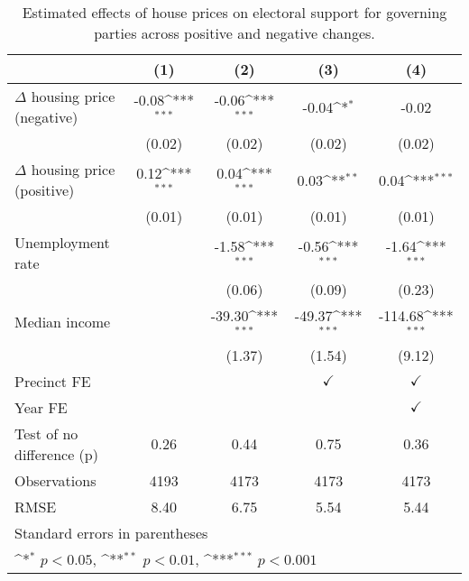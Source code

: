 \begin{table}[htbp]\centering
\def\sym#1{\ifmmode^{#1}\else\(^{#1}\)\fi}
\caption{Estimated effects of house prices on electoral support for governing parties across positive and negative changes.} \label{tab4}
\begin{tabular}{l*{4}{c}}
\hline\hline
                    &\multicolumn{1}{c}{(1)}         &\multicolumn{1}{c}{(2)}         &\multicolumn{1}{c}{(3)}         &\multicolumn{1}{c}{(4)}         \\
\hline
$\Delta$ housing price (negative)&       -0.08\sym{***}&       -0.06\sym{***}&       -0.04\sym{*}  &       -0.02         \\
                    &      (0.02)         &      (0.02)         &      (0.02)         &      (0.02)         \\
[1em]
$\Delta$ housing price (positive)&        0.12\sym{***}&        0.04\sym{***}&        0.03\sym{**} &        0.04\sym{***}\\
                    &      (0.01)         &      (0.01)         &      (0.01)         &      (0.01)         \\
[1em]
Unemployment rate   &                     &       -1.58\sym{***}&       -0.56\sym{***}&       -1.64\sym{***}\\
                    &                     &      (0.06)         &      (0.09)         &      (0.23)         \\
[1em]
Median income       &                     &      -39.30\sym{***}&      -49.37\sym{***}&     -114.68\sym{***}\\
                    &                     &      (1.37)         &      (1.54)         &      (9.12)         \\
[1em]
\hline Precinct FE  &                     &                     &$\checkmark$         &$\checkmark$         \\
[1em]
Year FE             &                     &                     &                     &$\checkmark$         \\
\hline
Test of no difference (p)&        0.26         &        0.44         &        0.75         &        0.36         \\
Observations        &        4193         &        4173         &        4173         &        4173         \\
RMSE                &        8.40         &        6.75         &        5.54         &        5.44         \\
\hline\hline
\multicolumn{5}{l}{\footnotesize Standard errors in parentheses}\\
\multicolumn{5}{l}{\footnotesize \sym{*} \(p<0.05\), \sym{**} \(p<0.01\), \sym{***} \(p<0.001\)}\\
\end{tabular}
\end{table}
